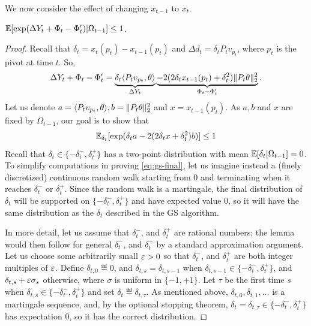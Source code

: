 We now consider the effect of changing $x_{t-1}$ to $x_t$.
\begin{lemma}\label{lm:gs-subg-col}
    $\mathbb{E}[\exp(\Delta Y_t + \Phi_t - \Phi_t')|\Omega_{t-1}] \leq 1$.
\end{lemma}
\begin{proof}
Recall that $\delta_t= x_{t}(p_t)-x_{t-1}(p_t) $ and $\Delta d_t = \delta_t P_t v_{p_t}$, 
where $p_t$ is the pivot at time $t$. 
So, 
\[\Delta Y_t + \Phi_t - \Phi_t' =  \underbrace{\delta_t \langle P_t v_{p_t},\theta\rangle}_{\Delta Y_t} \underbrace{- 2(2 \delta_t x_{t-1}(p_t) + \delta_t^2 ) \|P_t \theta\|_2^2}_{\Phi_t - \Phi_t'}.\]
Let us denote $a = \langle P_t v_{p_t},\theta\rangle , b = \|P_t \theta\|_2^2$ and $x = x_{t-1}(p_t)$. As $a,b$ and $x$
are fixed by $\Omega_{t-1}$, our goal is to show that
\begin{equation} \mathbb{E}_{\delta_t} [\exp(\delta_t a -2(2 \delta_t x + \delta_t^2 ) b)] \leq 1 \label{eq:gs-final} \end{equation}
Recall that 
$\delta_t  \in \{-\delta^-_t, \delta^+_t\}$ has a two-point distribution with mean $\mathbb{E}[\delta_t|\Omega_{t-1}] = 0$. To simplify computations in proving \eqref{eq:gs-final}, let us imagine instead a (finely discretized) continuous random walk starting from $0$ and terminating when it reaches $\delta^-_t$ or $\delta^+_t$. 
Since the random walk is a martingale, the final distribution of $\delta_t$ will be supported on \(\{-\delta^-_t, \delta^+_t\}\) and have expected value $0$, so it will have the same distribution as the $\delta_t$ described in the GS algorithm.

In more detail, let us assume that $\delta^-_t$, and $\delta^+_t$ are rational numbers; the lemma would then follow for general $\delta^-_t$, and $\delta^+_t$ by a standard approximation argument. Let us choose some arbitrarily small $\varepsilon> 0$ so that $\delta^-_t$, and $\delta^+_t$ are both integer multiples of $\varepsilon$. Define $\delta_{t,0} \eqdef 0$, and $\delta_{t,s} = \delta_{t,s-1}$ when $\delta_{t,s-1} \in \{-\delta^-_t, \delta^+_t\}$, and $\delta_{t,s} + \varepsilon\sigma_s$ otherwise,  where $\sigma$ is uniform in $\{-1,+1\}$. Let $\tau$ be the first time $s$ when $\delta_{t,s} \in \{-\delta^-_t, \delta^+_t\}$ and set $\delta_t \eqdef \delta_{t,\tau}$. As mentioned above, $\delta_{t,0}, \delta_{t,1}, \ldots$ is a martingale sequence, and, by the optional stopping theorem, $\delta_t = \delta_{t,\tau} \in \{-\delta^-_t, \delta^+_t\}$ has expectation $0$, so it has the correct distribution.


\end{proof}
